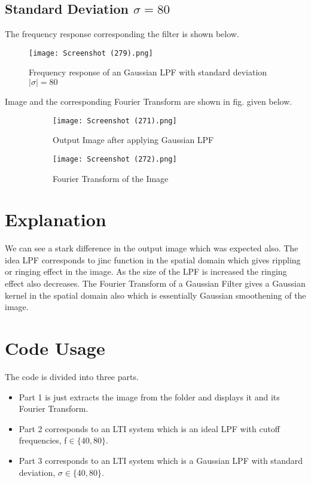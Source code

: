 \documentclass[12pt, a4paper]{article}
\begin{document}
\subsection{Standard Deviation $\sigma=80$}
The frequency response corresponding the filter is shown below.
\begin{figure}[h!]
  \centering
    \texttt{[image: Screenshot (279).png]}
    \caption{Frequency response of an Gaussian LPF with standard deviation $|\sigma|=80$}
  \label{fig:8}
\end{figure}

\clearpage

Image and the corresponding Fourier Transform are shown in fig. given below.
\begin{figure}[H]
  \centering
  \begin{subfigure}[b]{0.45\linewidth}
    \texttt{[image: Screenshot (271).png]}
    \caption{Output Image after applying Gaussian LPF}
  \end{subfigure}
  \begin{subfigure}[b]{0.45\linewidth}
    \texttt{[image: Screenshot (272).png]}
    \caption{Fourier Transform of the Image}
  \end{subfigure}
  \caption{}
  \label{fig:9}
\end{figure}

\section{Explanation}
We can see a stark difference in the output image which was expected also. The idea LPF corresponds to jinc function in the spatial domain which gives rippling or ringing effect in the image. As the size of the LPF is increased the ringing effect also decreases. The Fourier Transform of a Gaussian Filter gives a Gaussian kernel in the spatial domain also which is essentially Gaussian smoothening of the image.

\section{Code Usage}
The code is divided into three parts.
\begin{itemize}
    \item Part 1 is just extracts the image from the folder and displays it and its Fourier Transform.
    \item Part 2 corresponds to an LTI system which is an ideal LPF with cutoff frequencies, f$\in\{40, 80\}$. 
    \item Part 3 corresponds to an LTI system which is a Gaussian LPF with standard deviation, $\sigma\in\{40, 80\}$. 
\end{itemize}
\end{document}

